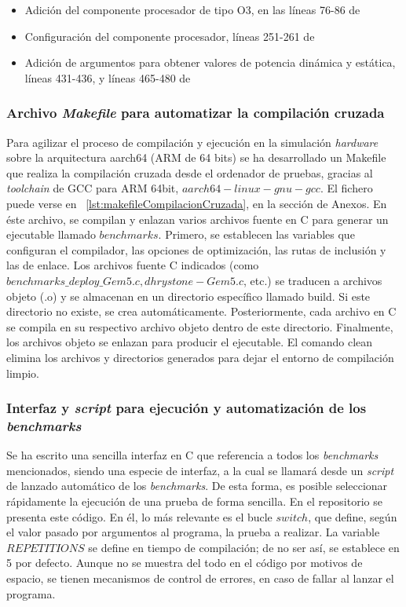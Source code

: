 \begin{itemize}
    \item Adición del componente procesador de tipo \ac{O3}, en las líneas 76-86 de \cite{repoTFM-starterfs}
    \item Configuración del componente procesador, líneas 251-261 de \cite{repoTFM-starterfs}
    \item Adición de argumentos para obtener valores de potencia dinámica y estática, líneas 431-436, y líneas 465-480 de \cite{repoTFM-starterfs}
\end{itemize}

\subsubsection{Archivo \textit{Makefile} para automatizar la compilación cruzada}

Para agilizar el proceso de compilación y ejecución en la simulación \textit{hardware} sobre la arquitectura aarch64 (\ac{ARM} de 64 bits) se ha desarrollado un Makefile que realiza la compilación cruzada desde el ordenador de pruebas, gracias al \textit{toolchain} de \ac{GCC} para ARM 64bit, $aarch64-linux-gnu-gcc$. El fichero puede verse en ~\ref{lst:makefileCompilacionCruzada}, en la sección de Anexos. En éste archivo, se compilan y enlazan varios archivos fuente en C para generar un ejecutable llamado $benchmarks$. Primero, se establecen las variables que configuran el compilador, las opciones de optimización, las rutas de inclusión y las de enlace. Los archivos fuente C indicados (como $benchmarks\_deploy\_Gem5.c, dhrystone-Gem5.c$, etc.) se traducen a archivos objeto (.o) y se almacenan en un directorio específico llamado build. Si este directorio no existe, se crea automáticamente. Posteriormente, cada archivo en C se compila en su respectivo archivo objeto dentro de este directorio. Finalmente, los archivos objeto se enlazan para producir el ejecutable. El comando clean elimina los archivos y directorios generados para dejar el entorno de compilación limpio.

\subsubsection{Interfaz y \textit{script} para ejecución y automatización de los \textit{benchmarks}}

Se ha escrito una sencilla interfaz en C que referencia a todos los \textit{benchmarks} mencionados, siendo una especie de interfaz, a la cual se llamará desde un \textit{script} de lanzado automático de los \textit{benchmarks}. De esta forma, es posible seleccionar rápidamente la ejecución de una prueba de forma sencilla. En el repositorio \cite{repoTFM} \cite{repoTFM-interfazEjecuciones} se presenta este código. En él, lo más relevante es el bucle $switch$, que define, según el valor pasado por argumentos al programa, la prueba a realizar. La variable $REPETITIONS$ se define en tiempo de compilación; de no ser así, se establece en 5 por defecto. Aunque no se muestra del todo en el código por motivos de espacio, se tienen mecanismos de control de errores, en caso de fallar al lanzar el programa. 

